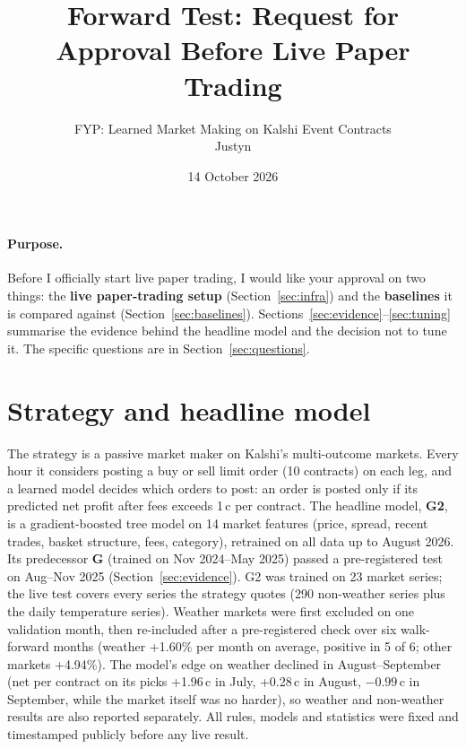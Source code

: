\documentclass[11pt,a4paper]{article}
\title{Forward Test: Request for Approval Before Live Paper Trading}
\author{FYP: Learned Market Making on Kalshi Event Contracts \\ Justyn}
\date{14 October 2026}
\begin{document}
\maketitle
\vspace{-1.5em}

\paragraph{Purpose.} Before I officially start live paper trading, I would like your approval on two things: the
\textbf{live paper-trading setup} (Section~\ref{sec:infra}) and the \textbf{baselines} it is compared against
(Section~\ref{sec:baselines}). Sections~\ref{sec:evidence}--\ref{sec:tuning} summarise the evidence behind the
headline model and the decision not to tune it. The specific questions are in Section~\ref{sec:questions}.

\section{Strategy and headline model}
The strategy is a passive market maker on Kalshi's multi-outcome markets. Every hour it considers posting a buy or
sell limit order (10 contracts) on each leg, and a learned model decides which orders to post: an order is posted
only if its predicted net profit after fees exceeds 1\,c per contract. The headline model, \textbf{G2}, is a
gradient-boosted tree model on 14 market features (price, spread, recent trades, basket structure, fees,
category), retrained on all data up to August 2026. Its predecessor \textbf{G} (trained on Nov 2024--May 2025)
passed a pre-registered test on Aug--Nov 2025 (Section~\ref{sec:evidence}). G2 was trained on 23 market series;
the live test covers every series the strategy quotes (290 non-weather series plus the daily temperature
series). Weather markets were first excluded on one validation month, then re-included after a pre-registered check
over six walk-forward months (weather +1.60\% per month on average, positive in 5 of 6; other markets +4.94\%).
The model's edge on weather declined in August--September (net per contract on its picks +1.96\,c in July,
+0.28\,c in August, $-0.99$\,c in September, while the market itself was no harder), so weather and non-weather
results are also reported separately. All rules, models and statistics were fixed and timestamped publicly before
any live result.
\end{document}
